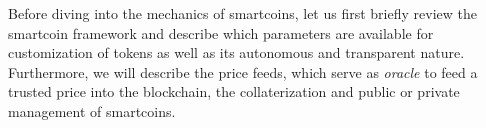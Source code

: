 Before diving into the mechanics of smartcoins, let us first briefly
review the smartcoin framework and describe which parameters are
available for customization of tokens as well as its autonomous and
transparent nature. Furthermore, we will describe the price feeds, which serve
as \emph{oracle} to feed a trusted price into the blockchain, the collaterization 
and public or private management of smartcoins.